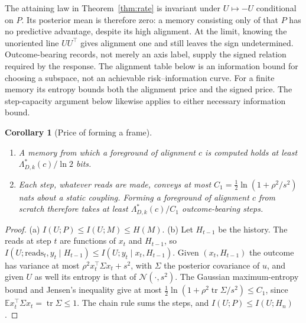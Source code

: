 \documentclass[12pt]{article}
\newtheorem{corollary}[theorem]{Corollary}
\theoremstyle{definition}
\newcommand{\E}{\mathbb E}
\newcommand{\tr}{\operatorname{tr}}
\begin{document}
The attaining law in Theorem~\ref{thm:rate} is invariant under
$U\mapsto-U$ conditional on $P$. Its posterior mean is therefore zero:
a memory consisting only of that $P$ has no predictive advantage,
despite its high alignment. At the limit, knowing the unoriented line
$UU^\top$ gives alignment one and still leaves the sign undetermined.
Outcome-bearing records, not merely an axis label, supply the signed
relation required by the response. The alignment table below is an
information bound for choosing a subspace, not an achievable
risk--information curve. For a finite memory its entropy bounds both
the alignment price and the signed price. The step-capacity argument
below likewise applies to either necessary information bound.

\begin{corollary}[Price of forming a frame]
\label{cor:price}
\begin{enumerate}
\item[(a)] A memory from which a foreground of alignment $c$ is computed holds at least $\Lambda^*_{D,k}(c)/\ln2$ bits.
\item[(b)] Each step, whatever reads are made, conveys at most $C_1=\tfrac12\ln(1+\rho^2/s^2)$ nats about a static coupling. Forming a foreground of alignment $c$ from scratch therefore takes at least $\Lambda^*_{D,k}(c)/C_1$ outcome-bearing steps.
\end{enumerate}
\end{corollary}

\begin{proof}
(a) $I(U;P)\le I(U;M)\le H(M)$. (b) Let $H_{t-1}$ be the history. The reads at step $t$ are functions of $x_t$ and $H_{t-1}$, so $I(U;\text{reads}_t,y_t\mid H_{t-1})\le I(U;y_t\mid x_t,H_{t-1})$. Given $(x_t,H_{t-1})$ the outcome has variance at most $\rho^2x_t^{\top}\Sigma x_t+s^2$, with $\Sigma$ the posterior covariance of $u$, and given $U$ as well its entropy is that of $\mathcal N(\cdot,s^2)$. The Gaussian maximum-entropy bound and Jensen's inequality give at most $\tfrac12\ln(1+\rho^2\tr\Sigma/s^2)\le C_1$, since $\E x_t^{\top}\Sigma x_t=\tr\Sigma\le1$. The chain rule sums the steps, and $I(U;P)\le I(U;H_n)$.
\end{proof}
\end{document}

